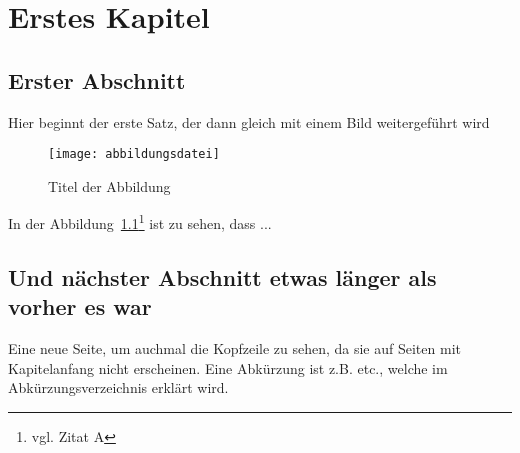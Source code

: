 \chapter{Erstes Kapitel}
\section{Erster Abschnitt}

Hier beginnt der erste Satz, der dann gleich mit einem Bild weitergeführt wird
\begin{figure}[htbp]
\centering
\texttt{[image: abbildungsdatei]} %
\caption{Titel der Abbildung} 
\label{fig:bild1}
\end{figure}

In der Abbildung~\ref{fig:bild1}\footnote{vgl. Zitat A\cite{referenzA}} %
ist zu sehen, dass ...

\newpage

\section{Und nächster Abschnitt etwas länger als vorher es war}
Eine neue Seite, um auchmal die Kopfzeile zu sehen, da sie auf Seiten mit Kapitelanfang nicht erscheinen. Eine Abkürzung ist z.B. etc., welche im 
Abkürzungsverzeichnis erklärt wird. 
